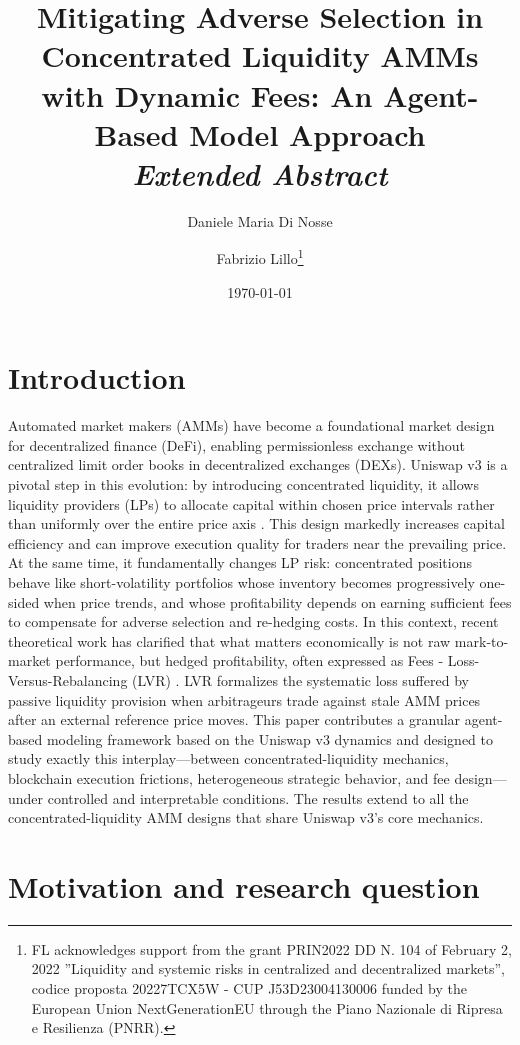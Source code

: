 \documentclass[11pt]{article}
\title{Mitigating Adverse Selection in Concentrated Liquidity AMMs with Dynamic Fees: An Agent-Based Model Approach\\[0.3em]
\large \textit{Extended Abstract}}
\author[1]{Daniele Maria Di Nosse}
\author[1]{Fabrizio Lillo\footnote{FL acknowledges support from
the grant PRIN2022 DD N. 104 of February 2, 2022 ”Liquidity and systemic risks in centralized and decentralized markets”,
codice proposta 20227TCX5W - CUP J53D23004130006 funded by the European Union NextGenerationEU through the Piano
Nazionale di Ripresa e Resilienza (PNRR).}}
\affil[1]{Scuola Normale Superiore, Pisa, Italy}
\date{\today}
\begin{document}
\maketitle

\section{Introduction}
Automated market makers (AMMs) have become a foundational market design for decentralized finance (DeFi), enabling 
permissionless exchange without centralized limit order books in decentralized exchanges (DEXs). Uniswap v3 is a pivotal 
step in this evolution: by introducing concentrated liquidity, it allows liquidity providers (LPs) to allocate capital 
within chosen price intervals rather than uniformly over the entire price axis \cite{adams2021}.
This design markedly increases capital efficiency and can improve execution quality for traders near the prevailing price. 
At the same time, it fundamentally changes LP risk: concentrated positions behave like short-volatility portfolios whose 
inventory becomes progressively one-sided when price trends, and whose profitability depends on earning sufficient fees
to compensate for adverse selection and re-hedging costs. In this context, recent theoretical work has clarified that 
what matters economically is not raw mark-to-market performance, but hedged profitability, often expressed as 
Fees - Loss-Versus-Rebalancing (LVR) \cite{milionis2023}. LVR formalizes the systematic loss suffered by passive liquidity provision 
when arbitrageurs trade against stale AMM prices after an external reference price moves. This paper contributes a 
granular agent-based modeling framework based on the Uniswap v3 dynamics and designed to study exactly this 
interplay—between concentrated-liquidity mechanics, blockchain execution frictions, heterogeneous strategic behavior, and fee 
design—under controlled and interpretable conditions. The results extend to all the concentrated-liquidity AMM designs that share
Uniswap v3’s core mechanics. 


\section{Motivation and research question}
\end{document}
